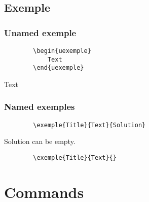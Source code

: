\documentclass[french]{article}
\begin{document}
    \subsection{Exemple}

    \subsubsection{Unamed exemple}

    \begin{verbatim}
        \begin{uexemple}
            Text
        \end{uexemple}
    \end{verbatim}
    
    \begin{uexemple}
        Text
    \end{uexemple}

    \subsubsection{Named exemples}

    \begin{verbatim}
        \exemple{Title}{Text}{Solution}
    \end{verbatim}


    \begin{warning}
        Solution can be empty.
    \end{warning}
    
    \begin{verbatim}
        \exemple{Title}{Text}{}
    \end{verbatim}


\section{Commands}
\end{document}
